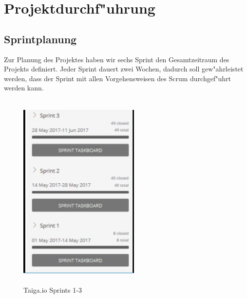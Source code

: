 \documentclass[a4paper, 11pt]{scrreprt}
\begin{document}
\section{Projektdurchf"uhrung}

\subsection{Sprintplanung}

Zur Planung des Projektes haben wir sechs Sprint den Gesamtzeitraum des Projekts definiert. Jeder Sprint dauert zwei
Wochen, dadurch soll gew"ahrleistet werden, dass der Sprint mit allen Vorgehensweisen des Scrum durchgef"uhrt werden kann.

\begin{figure} [H]
\begin{center}

\includegraphics[width=6cm, height=10cm]{sprint_2.jpg}
\caption{Taiga.io Sprints 1-3}

\end{center}
\end{figure}
\end{document}
